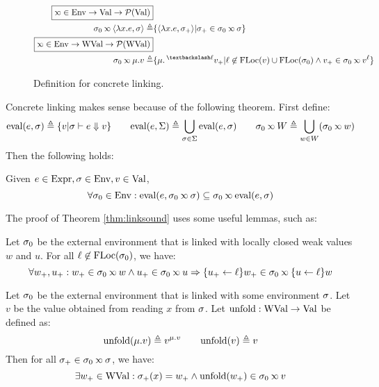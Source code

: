 \documentclass{article}
\begin{document}
\begin{figure}
\begin{align*}
    \fbox{$\semlink\in\Ctx\rightarrow\Value\rightarrow\pset(\Value)$}                                                                                                                               \\
    \ctx_0\semlink\langle\lambda x.e,\ctx\rangle\triangleq & \{\langle\lambda x.e,\ctx_+\rangle|\ctx_+\in\ctx_0\semlink\ctx\}                                                                       \\
    \fbox{$\semlink\in\Ctx\rightarrow\Walue\rightarrow\pset(\Walue)$}                                                                                                                               \\
    \ctx_0\semlink\mu.v\triangleq                          & \{\mu.\closeloc{\ell}{v_+}|\ell\not\in\FLoc(v)\cup\FLoc(\ctx_0)\land v_+\in\ctx_0\semlink\openloc{\ell}{v}\}
  \end{align*}
  \caption{Definition for concrete linking.}
  \label{fig:conclink}
\end{figure}

Concrete linking makes sense because of the following theorem.
First define:
\[\eval(e,\ctx)\triangleq\{v|\ctx\vdash e\Downarrow v\}\qquad\eval(e,\Sigma)\triangleq\bigcup_{\ctx\in\Sigma}\eval(e,\ctx)\qquad\ctx_0\semlink W\triangleq\bigcup_{w\in W}(\ctx_0\semlink w)\]
Then the following holds:
\begin{thm}\label{thm:linksound}
  Given $e\in\Expr,\ctx\in\Ctx,v\in\Value$,
  \[\forall\ctx_0\in\Ctx:\eval(e,\ctx_0\semlink\ctx)\subseteq\ctx_0\semlink\eval(e,\ctx)\]
\end{thm}

The proof of Theorem \ref{thm:linksound} uses some useful lemmas, such as:
\begin{lem}
  Let $\ctx_0$ be the external environment that is linked with locally closed weak values $w$ and $u$.
  For all $\ell\not\in\FLoc(\ctx_0)$, we have:
  \[\forall w_+,u_+:w_+\in\ctx_0\semlink w\wedge u_+\in\ctx_0\semlink u\Rightarrow\{u_+\leftarrow\ell\}w_+\in\ctx_0\semlink\{u\leftarrow\ell\}w\]
\end{lem}
\begin{lem}
  Let $\ctx_0$ be the external environment that is linked with some environment $\ctx$.
  Let $v$ be the value obtained from reading $x$ from $\ctx$.
  Let $\text{unfold}:\Walue\rightarrow\Value$ be defined as:
  \[\text{unfold}(\mu.v)\triangleq\openloc{\mu.v}{v}\qquad\text{unfold}(v)\triangleq v\]
  Then for all $\ctx_+\in\ctx_0\semlink\ctx$, we have:
  \[\exists w_+\in\Walue:\ctx_+(x)=w_+\land\text{unfold}(w_+)\in\ctx_0\semlink v\]
\end{lem}
\clearpage
\end{document}

